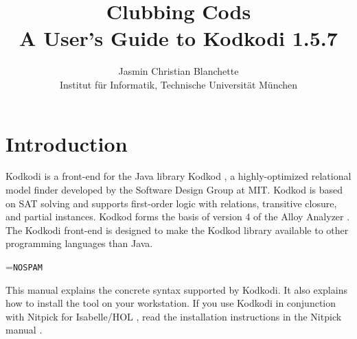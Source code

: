 \documentclass[a4paper,12pt]{article}
\begin{document}
\title{Clubbing Cods \\[\smallskipamount]
\Large A User's Guide to Kodkodi 1.5.7}
\author{Jasmin Christian Blanchette \\
{\normalsize Institut f\"ur Informatik, Technische Universit\"at M\"unchen}}

\maketitle

\tableofcontents

\setlength{\parskip}{.7em plus .2em minus .1em}
\setlength{\parindent}{0pt}
\setlength{\abovedisplayskip}{\parskip}
\setlength{\abovedisplayshortskip}{.9\parskip}
\setlength{\belowdisplayskip}{\parskip}
\setlength{\belowdisplayshortskip}{.9\parskip}

\newenvironment{enum}%
    {\begin{list}{}{%
        \setlength{\topsep}{.1\parskip}%
        \setlength{\partopsep}{.1\parskip}%
        \setlength{\itemsep}{\parskip}%
        \advance\itemsep by-\parsep}}
    {\end{list}}

\def\pre{\begingroup\vskip0pt plus1ex\advance\leftskip by\leftmargin
\advance\rightskip by\leftmargin}
\def\post{\vskip0pt plus1ex\endgroup}

\def\prew{\pre\advance\rightskip by-\leftmargin}
\def\postw{\post}

\def\cpp{C\nobreak\raisebox{.1ex}{+}\nobreak\raisebox{.1ex}{+}}

\section{Introduction}
\label{introduction}

Kodkodi is a front-end for the Java library Kodkod \cite{torlak-jackson-2007}, a
highly-optimized relational model finder developed by the Software Design Group
at MIT. Kodkod is based on SAT solving and supports first-order logic with
relations, transitive closure, and partial instances. Kodkod forms the basis of
version 4 of the Alloy Analyzer \cite{jackson-2006}. The Kodkodi
front-end is designed to make the Kodkod library available to other programming
languages than Java.

\newbox\boxA
\setbox\boxA=\hbox{\texttt{NOSPAM}}

This manual explains the concrete syntax supported by Kodkodi. It also explains
how to install the tool on your workstation. If you use Kodkodi in conjunction
with Nitpick for Isabelle/HOL \cite{nitpick-2009}, read the installation
instructions in the Nitpick manual \cite{blanchette-2009}.
\end{document}

